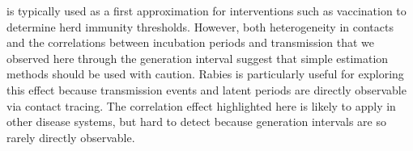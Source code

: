\rzero is typically used as a first approximation for interventions such as vaccination to determine herd immunity thresholds. 
However, both heterogeneity in contacts and the correlations between incubation periods and transmission that we observed here through the generation interval suggest that simple \rzero estimation methods should be used with caution. 
Rabies is particularly useful for exploring this effect because transmission events and latent periods are directly observable via contact tracing. The correlation effect highlighted here is likely to apply in other disease systems, but hard to detect because generation intervals are so rarely directly observable.

